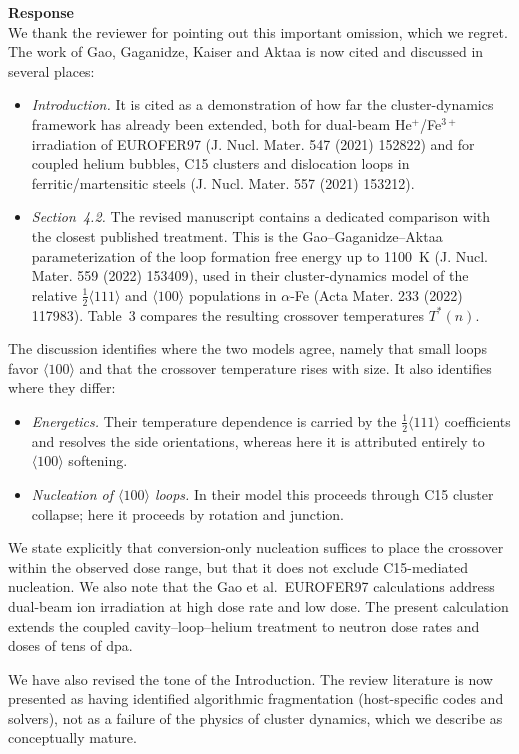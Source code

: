 \documentclass{article}
\newcommand{\hkl}[1]{\langle #1\rangle}
\newcommand{\half}{\tfrac{1}{2}}
\begin{document}
\begin{itemize}
\textbf{Response}\\
We thank the reviewer for pointing out this important omission, which we regret. The work of Gao, Gaganidze, Kaiser and Aktaa is now cited and discussed in several places:
\begin{itemize}
    \item \emph{Introduction.} It is cited as a demonstration of how far the cluster-dynamics framework has already been extended, both for dual-beam He$^{+}$/Fe$^{3+}$ irradiation of EUROFER97 (J. Nucl. Mater. 547 (2021) 152822) and for coupled helium bubbles, C15 clusters and dislocation loops in ferritic/martensitic steels (J. Nucl. Mater. 557 (2021) 153212).
    \item \emph{Section~4.2.} The revised manuscript contains a dedicated comparison with the closest published treatment. This is the Gao--Gaganidze--Aktaa parameterization of the loop formation free energy up to 1100~K (J. Nucl. Mater. 559 (2022) 153409), used in their cluster-dynamics model of the relative $\half\hkl{111}$ and $\hkl{100}$ populations in $\alpha$-Fe (Acta Mater. 233 (2022) 117983). Table~3 compares the resulting crossover temperatures $T^*(n)$.
\end{itemize}
The discussion identifies where the two models agree, namely that small loops favor $\hkl{100}$ and that the crossover temperature rises with size. It also identifies where they differ:
\begin{itemize}
    \item \emph{Energetics.} Their temperature dependence is carried by the $\half\hkl{111}$ coefficients and resolves the side orientations, whereas here it is attributed entirely to $\hkl{100}$ softening.
    \item \emph{Nucleation of $\hkl{100}$ loops.} In their model this proceeds through C15 cluster collapse; here it proceeds by rotation and junction.
\end{itemize}
We state explicitly that conversion-only nucleation suffices to place the crossover within the observed dose range, but that it does not exclude C15-mediated nucleation. We also note that the Gao et al.\ EUROFER97 calculations address dual-beam ion irradiation at high dose rate and low dose. The present calculation extends the coupled cavity--loop--helium treatment to neutron dose rates and doses of tens of dpa.

We have also revised the tone of the Introduction. The review literature is now presented as having identified algorithmic fragmentation (host-specific codes and solvers), not as a failure of the physics of cluster dynamics, which we describe as conceptually mature.


\end{itemize}
\end{document}
